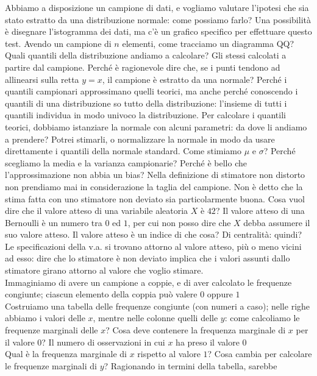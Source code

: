 \documentclass{article}
\begin{document}
    Abbiamo a disposizione un campione di dati, e vogliamo valutare l'ipotesi che sia stato estratto da una distribuzione normale: come possiamo farlo? Una possibilità è
    disegnare l'istogramma dei dati, ma c'è un grafico specifico per effettuare questo test. Avendo un campione di $ n $ elementi, come tracciamo un diagramma QQ? Quali
    quantili della distribuzione andiamo a calcolare? Gli stessi calcolati a partire dal campione. Perché è ragionevole dire che, se i punti tendono ad allinearsi sulla retta
    $ y = x $, il campione è estratto da una normale? Perché i quantili campionari approssimano quelli teorici, ma anche perché conoscendo i quantili di una distribuzione so
    tutto della distribuzione: l'insieme di tutti i quantili individua in modo univoco la distribuzione. Per calcolare i quantili teorici, dobbiamo istanziare la normale con
    alcuni parametri: da dove li andiamo a prendere? Potrei stimarli, o normalizzare la normale in modo da usare direttamente i quantili della normale standard. Come stimiamo
    $ \mu $ e $ \sigma $? Perché scegliamo la media e la varianza campionarie? Perché è bello che l'approssimazione non abbia un bias? Nella definizione di stimatore non
    distorto non prendiamo mai in considerazione la taglia del campione. Non è detto che la stima fatta con uno stimatore non deviato sia particolarmente buona. Cosa vuol dire
    che il valore atteso di una variabile aleatoria $ X $ è $ 42 $? Il valore atteso di una Bernoulli è un numero tra $ 0 $ ed $ 1 $, per cui non posso dire che $ X $ debba
    assumere il suo valore atteso. Il valore atteso è un indice di che cosa? Di centralità: quindi? Le specificazioni della v.a. si trovano attorno al valore atteso, più o
    meno vicini ad esso: dire che lo stimatore è non deviato implica che i valori assunti dallo stimatore girano attorno al valore che voglio stimare. \\
    Immaginiamo di avere un campione a coppie, e di aver calcolato le frequenze congiunte; ciascun elemento della coppia può valere $ 0 $ oppure $ 1 $ \\
    Costruiamo una tabella delle frequenze congiunte (con numeri a caso); nelle righe abbiamo i valori delle $ x $, mentre nelle colonne quelli delle $ y $: come calcoliamo le
    frequenze marginali delle $ x $? Cosa deve contenere la frequenza marginale di $ x $ per il valore $ 0 $? Il numero di osservazioni in cui $ x $ ha preso il valore $ 0 $
    \\
    Qual è la frequenza marginale di $ x $ rispetto al valore $ 1 $? Cosa cambia per calcolare le frequenze marginali di $ y $? Ragionando in termini della tabella, sarebbe
\end{document}
